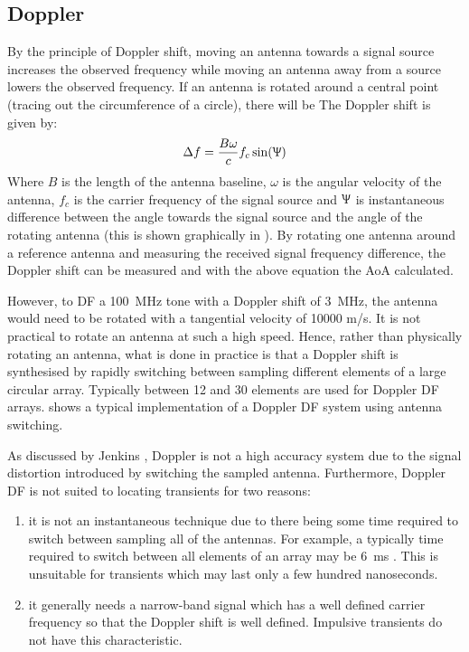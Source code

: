 \subsection{Doppler}
By the principle of Doppler shift, moving an antenna towards a signal source increases the observed frequency while moving an antenna away from a source lowers the observed frequency. 
If an antenna is rotated around a central point (tracing out the circumference of a circle), there will be 
The Doppler shift is given by: \cite{poisel2012electronic}
\begin{equation}
  \Delta f = \frac{B\omega}{c}f_c\sin(\Uppsi)
\end{equation}
Where \(B\) is the length of the antenna baseline, \(\omega\) is the angular velocity of the antenna, \(f_c\) is the carrier frequency of the signal source and \(\Uppsi\) is instantaneous difference between the angle towards the signal source and the angle of the rotating antenna (this is shown graphically in ). By rotating one antenna around a reference antenna and measuring the received signal frequency difference, the Doppler shift can be measured and with the above equation the AoA calculated.

However, to DF a \SI{100}{\mega\hertz} tone with a Doppler shift of \SI{3}{\mega\hertz}, the antenna would need to be rotated with a tangential velocity of 10000 m/s\cite{jenkins1991smallaperture}. 
It is not practical to rotate an antenna at such a high speed. 
Hence, rather than physically rotating an antenna, what is done in practice is that a Doppler shift is synthesised by rapidly switching between sampling different elements of a large circular array. 
Typically between 12 and 30 elements are used for Doppler DF arrays. 
 shows a typical implementation of a Doppler DF system using antenna switching.

As discussed by Jenkins \cite{jenkins1991smallaperture}, Doppler is not a high accuracy system due to the signal distortion introduced by switching the sampled antenna. Furthermore, Doppler DF is not suited to locating transients for two reasons:
\begin{enumerate}
  \item it is not an instantaneous technique due to there being some time required to switch between sampling all of the antennas. For example, a typically time required to switch between all elements of an array may be \SI{6}{\milli\second} \cite{rhode2000introtodf}. This is unsuitable for transients which may last only a few hundred nanoseconds.
  \item it generally needs a narrow-band signal which has a well defined carrier frequency so that the Doppler shift is well defined. Impulsive transients do not have this characteristic.
\end{enumerate}

